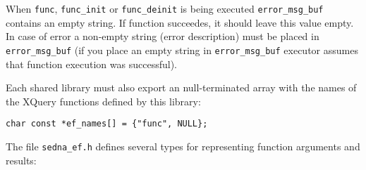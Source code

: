 \documentclass[a4paper,12pt]{article}
\begin{document}
When \verb!func!, \verb!func_init! or \verb!func_deinit! is being executed
\verb!error_msg_buf! contains an empty string. If function succeedes, it should
leave this value empty. In case of error a non-empty string (error description)
must be placed in \verb!error_msg_buf! (if you place an empty string in
\verb!error_msg_buf! executor assumes that function execution was successful).

Each shared library must also export an null-terminated array with the names
of the XQuery functions defined by this library:

\begin{verbatim}
char const *ef_names[] = {"func", NULL};
\end{verbatim}

The file \verb!sedna_ef.h! defines several types for representing function
arguments and results:
\end{document}
